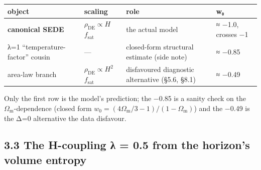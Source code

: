 \documentclass[
  10pt,
]{article}
\begin{document}
\begin{longtable}[]{@{}
  >{\raggedright\arraybackslash}p{}
  >{\raggedright\arraybackslash}p{}
  >{\raggedright\arraybackslash}p{}
  >{\raggedright\arraybackslash}p{}@{}}
\toprule\noalign{}
\begin{minipage}[b]{\linewidth}\raggedright
object
\end{minipage} & \begin{minipage}[b]{\linewidth}\raggedright
scaling
\end{minipage} & \begin{minipage}[b]{\linewidth}\raggedright
role
\end{minipage} & \begin{minipage}[b]{\linewidth}\raggedright
w₀
\end{minipage} \\
\midrule\noalign{}
\endhead
\bottomrule\noalign{}
\endlastfoot
\textbf{canonical SEDE} & \(\rho _{\mathrm{DE}} \propto  H\)
\(f_{\mathrm{sat}}\) & the actual model & ≈ −1.0, crosses −1 \\
λ=1 ``temperature-factor'' cousin & --- & closed-form structural
estimate (side note) & ≈ −0.85 \\
area-law branch & \(\rho _{\mathrm{DE}} \propto  H^{2}\)
\(f_{\mathrm{sat}}\) & disfavoured diagnostic alternative (§5.6, §8.1) &
≈ −0.49 \\
\end{longtable}

Only the first row is the model's prediction; the −0.85 is a sanity
check on the \(\Omega _{\mathrm{m}}\)-dependence (closed form
\(w_{0} = (4\Omega _{\mathrm{m}}/3 - 1)/(1 - \Omega _{\mathrm{m}})\))
and the −0.49 is the Δ=0 alternative the data disfavour.

\subsection{3.3 The H-coupling λ = 0.5 from the horizon's volume
entropy}\label{the-h-coupling-ux3bb-0.5-from-the-horizons-volume-entropy}
\end{document}
